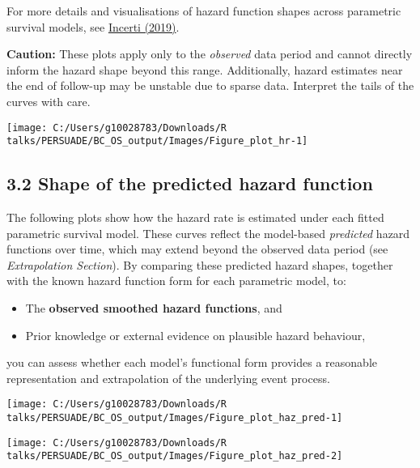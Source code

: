 \documentclass[
]{article}
\providecommand{\tightlist}{%
  \setlength{\itemsep}{0pt}\setlength{\parskip}{0pt}}
\begin{document}
For more details and visualisations of hazard function shapes across
parametric survival models, see
\href{https://devinincerti.com/2019/06/18/parametric_survival.html}{Incerti
(2019)}.

\textbf{Caution:} These plots apply only to the \emph{observed} data
period and cannot directly inform the hazard shape beyond this range.
Additionally, hazard estimates near the end of follow-up may be unstable
due to sparse data. Interpret the tails of the curves with care.

\clearpage

\begin{flushleft}\texttt{[image: C:/Users/g10028783/Downloads/R talks/PERSUADE/BC\_OS\_output/Images/Figure\_plot\_hr-1]} \end{flushleft}

\clearpage

\subsection{3.2 Shape of the predicted hazard
function}\label{shape-of-the-predicted-hazard-function}

The following plots show how the hazard rate is estimated under each
fitted parametric survival model. These curves reflect the model-based
\emph{predicted} hazard functions over time, which may extend beyond the
observed data period (see \emph{Extrapolation Section}). By comparing
these predicted hazard shapes, together with the known hazard function
form for each parametric model, to:

\begin{itemize}
\tightlist
\item
  The \textbf{observed smoothed hazard functions}, and\\
\item
  Prior knowledge or external evidence on plausible hazard behaviour,
\end{itemize}

you can assess whether each model's functional form provides a
reasonable representation and extrapolation of the underlying event
process.

\clearpage

\begin{flushleft}\texttt{[image: C:/Users/g10028783/Downloads/R talks/PERSUADE/BC\_OS\_output/Images/Figure\_plot\_haz\_pred-1]} \end{flushleft}

\begin{flushleft}\texttt{[image: C:/Users/g10028783/Downloads/R talks/PERSUADE/BC\_OS\_output/Images/Figure\_plot\_haz\_pred-2]} \end{flushleft}
\end{document}
